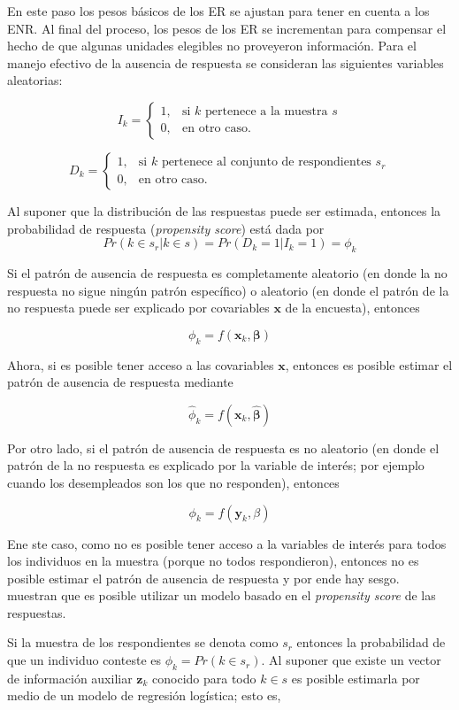 \documentclass[
  10pt,
  spanish,
]{book}
\begin{document}
En este paso los pesos básicos de los ER se ajustan para tener en cuenta a los ENR. Al final del proceso, los pesos de los ER se incrementan para compensar el hecho de que algunas unidades elegibles no proveyeron información. Para el manejo efectivo de la ausencia de respuesta se consideran las siguientes variables aleatorias:

\[
I_k=
\begin{cases}
1,  &\text{si $k$ pertenece a la muestra $s$}\\
0,  &\text{en otro caso.}
\end{cases}
\]

\[
D_k=
\begin{cases}
1,  &\text{si $k$ pertenece al conjunto de respondientes $s_r$}\\
0,  &\text{en otro caso.}
\end{cases}
\]

Al suponer que la distribución de las respuestas puede ser estimada, entonces la probabilidad de respuesta (\emph{propensity score}) está dada por
\[
Pr(k\in s_r|k\in s)=Pr(D_k = 1|I_k = 1)=\phi_k 
\]

Si el patrón de ausencia de respuesta es completamente aleatorio (en donde la no respuesta no sigue ningún patrón específico) o aleatorio (en donde el patrón de la no respuesta puede ser explicado por covariables \(\mathbf{x}\) de la encuesta), entonces

\[
\phi_k = f(\mathbf{x}_k, \boldsymbol{\beta})
\]

Ahora, si es posible tener acceso a las covariables \(\mathbf{x}\), entonces es posible estimar el patrón de ausencia de respuesta mediante

\[
\hat{\phi}_k = f(\mathbf{x}_k, \hat{\boldsymbol{\beta}})
\]

Por otro lado, si el patrón de ausencia de respuesta es no aleatorio (en donde el patrón de la no respuesta es explicado por la variable de interés; por ejemplo cuando los desempleados son los que no responden), entonces

\[
\phi_k = f(\mathbf{y}_k, \beta)
\]

Ene ste caso, como no es posible tener acceso a la variables de interés para todos los individuos en la muestra (porque no todos respondieron), entonces no es posible estimar el patrón de ausencia de respuesta y por ende hay sesgo. \citet{Kim_Riddles_2012} muestran que es posible utilizar un modelo basado en el \emph{propensity score} de las respuestas.

Si la muestra de los respondientes se denota como \(s_r\) entonces la probabilidad de que un individuo conteste es \(\phi_k = Pr(k \in s_r)\). Al suponer que existe un vector de información auxiliar \(\mathbf{z}_k\) conocido para todo \(k\in s\) es posible estimarla por medio de un modelo de regresión logística; esto es,
\end{document}
